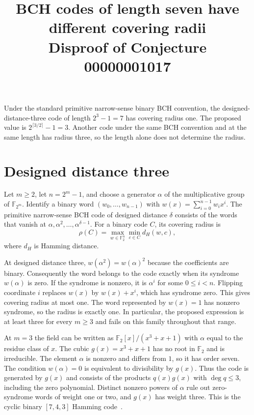 \documentclass[11pt]{article}
\title{BCH codes of length seven have different covering radii\\[2pt]
  \large Disproof of Conjecture 00000001017}
\author{}
\date{}
\begin{document}
\maketitle

\noindent
Under the standard primitive narrow-sense binary BCH convention,
the designed-distance-three code of length $2^3-1=7$ has covering radius
one. The proposed value is $2^{\lceil 3/2\rceil}-1=3$. Another code under
the same BCH convention and at the same length has radius three, so the
length alone does not determine the radius.

\section*{Designed distance three}

Let $m\ge2$, let $n=2^m-1$, and choose a generator $\alpha$ of the
multiplicative group of $\mathbb F_{2^m}$. Identify a binary word
$(w_0,\ldots,w_{n-1})$ with $w(x)=\sum_{i=0}^{n-1}w_i x^i$. The primitive
narrow-sense BCH code of designed distance $\delta$ consists of the words
that vanish at $\alpha,\alpha^2,\ldots,\alpha^{\delta-1}$. For a binary
code $C$, its covering radius is
\[
\rho(C)=\max_{w\in\mathbb F_2^n}\min_{c\in C}d_H(w,c),
\]
where $d_H$ is Hamming distance.

At designed distance three, $w(\alpha^2)=w(\alpha)^2$ because the
coefficients are binary. Consequently the word belongs to the code exactly
when its syndrome $w(\alpha)$ is zero. If the syndrome is nonzero, it is
$\alpha^i$ for some $0\le i<n$. Flipping coordinate $i$ replaces $w(x)$ by
$w(x)+x^i$, which has syndrome zero. This gives covering radius at most one.
The word represented by $w(x)=1$ has nonzero syndrome, so the radius is
exactly one. In particular, the proposed expression is at least three for
every $m\ge3$ and fails on this family throughout that range.

At $m=3$ the field can be written as
$\mathbb F_2[x]/(x^3+x+1)$ with $\alpha$ equal to the residue class of $x$.
The cubic $g(x)=x^3+x+1$ has no root in $\mathbb F_2$ and is irreducible.
The element $\alpha$ is nonzero and differs from $1$, so it has order
seven. The condition $w(\alpha)=0$ is equivalent to divisibility by
$g(x)$. Thus the code is generated by $g(x)$ and consists of the products
$q(x)g(x)$ with $\deg q\le3$, including the zero polynomial. Distinct
nonzero powers of $\alpha$ rule out zero-syndrome words of weight one or
two, and $g(x)$ has weight three. This is the cyclic binary $[7,4,3]$
Hamming code~\cite{tervo}.
\end{document}
